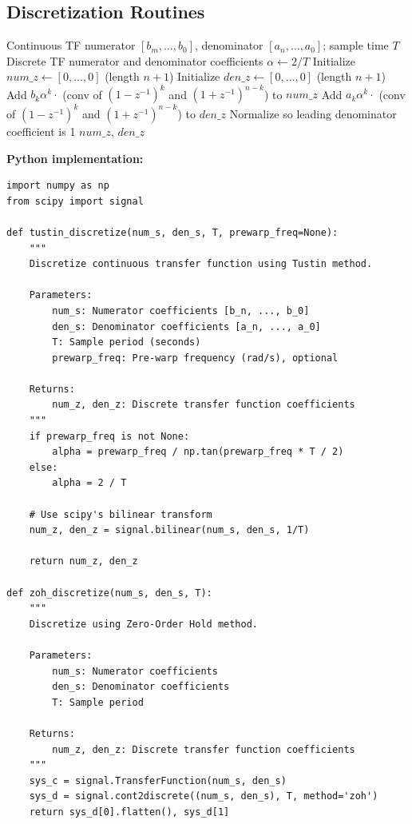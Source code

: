 \subsection{Discretization Routines}

\begin{algorithm}[htbp]
\caption{Tustin Discretization of Transfer Function}
\label{alg:tustin_discretization}
\begin{algorithmic}[1]
\REQUIRE Continuous TF numerator $[b_m, \ldots, b_0]$, denominator $[a_n, \ldots, a_0]$; sample time $T$
\ENSURE Discrete TF numerator and denominator coefficients
\STATE $\alpha \gets 2/T$
\STATE {}
\STATE Initialize $num\_z \gets [0, \ldots, 0]$ (length $n+1$)
\STATE Initialize $den\_z \gets [0, \ldots, 0]$ (length $n+1$)
    \STATE Add $b_k \alpha^k \cdot$ (conv of $(1-z^{-1})^k$ and $(1+z^{-1})^{n-k}$) to $num\_z$
\ENDFOR
{}
    \STATE Add $a_k \alpha^k \cdot$ (conv of $(1-z^{-1})^k$ and $(1+z^{-1})^{n-k}$) to $den\_z$
\ENDFOR
\STATE Normalize so leading denominator coefficient is 1
\RETURN $num\_z$, $den\_z$
\end{algorithmic}
\end{algorithm}

\textbf{Python implementation:}

\begin{verbatim}
import numpy as np
from scipy import signal

def tustin_discretize(num_s, den_s, T, prewarp_freq=None):
    """
    Discretize continuous transfer function using Tustin method.

    Parameters:
        num_s: Numerator coefficients [b_n, ..., b_0]
        den_s: Denominator coefficients [a_n, ..., a_0]
        T: Sample period (seconds)
        prewarp_freq: Pre-warp frequency (rad/s), optional

    Returns:
        num_z, den_z: Discrete transfer function coefficients
    """
    if prewarp_freq is not None:
        alpha = prewarp_freq / np.tan(prewarp_freq * T / 2)
    else:
        alpha = 2 / T

    # Use scipy's bilinear transform
    num_z, den_z = signal.bilinear(num_s, den_s, 1/T)

    return num_z, den_z

def zoh_discretize(num_s, den_s, T):
    """
    Discretize using Zero-Order Hold method.

    Parameters:
        num_s: Numerator coefficients
        den_s: Denominator coefficients
        T: Sample period

    Returns:
        num_z, den_z: Discrete transfer function coefficients
    """
    sys_c = signal.TransferFunction(num_s, den_s)
    sys_d = signal.cont2discrete((num_s, den_s), T, method='zoh')
    return sys_d[0].flatten(), sys_d[1]
\end{verbatim}

